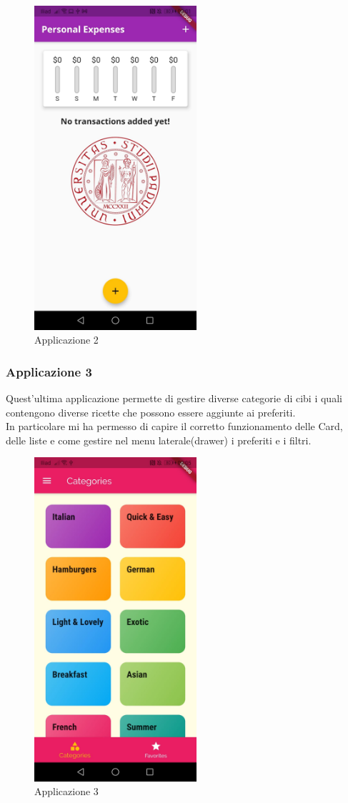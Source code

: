 \begin{figure}[htbp]	
	\centering
	\includegraphics[width=6cm]{immagini/app2.jpeg}
	\caption{Applicazione 2}
	\label{fig:Applicazione 2}
\end{figure}

\newpage

\subsubsection{Applicazione 3}
Quest'ultima applicazione permette di gestire diverse categorie di cibi i quali contengono diverse ricette che possono essere aggiunte ai preferiti.\\
In particolare mi ha permesso di capire il corretto funzionamento delle Card, delle liste e come gestire nel menu laterale(drawer) i preferiti e i filtri.\\

\begin{figure}[htbp]	
	\centering
	\includegraphics[width=6cm]{immagini/app3.jpeg}
	\caption{Applicazione 3}
	\label{fig:Applicazione 3}
\end{figure}






